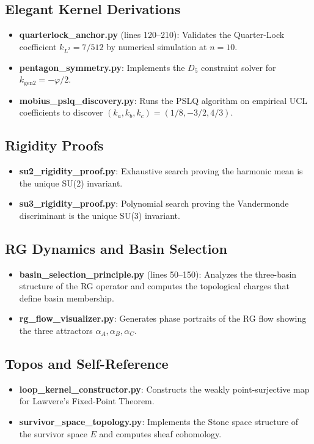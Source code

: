 \documentclass[11pt,twocolumn]{article}
\begin{document}
\subsection{Elegant Kernel Derivations}
\begin{itemize}[leftmargin=1.5em,itemsep=0.2em]
\item \textbf{quarterlock\_anchor.py} (lines 120--210): Validates the Quarter-Lock coefficient $k_{L^2} = 7/512$ by numerical simulation at $n=10$.
\item \textbf{pentagon\_symmetry.py}: Implements the $D_5$ constraint solver for $k_{\text{gen2}} = -\varphi/2$.
\item \textbf{mobius\_pslq\_discovery.py}: Runs the PSLQ algorithm on empirical UCL coefficients to discover $(k_a, k_b, k_c) = (1/8, -3/2, 4/3)$.
\end{itemize}

\subsection{Rigidity Proofs}
\begin{itemize}[leftmargin=1.5em,itemsep=0.2em]
\item \textbf{su2\_rigidity\_proof.py}: Exhaustive search proving the harmonic mean is the unique SU(2) invariant.
\item \textbf{su3\_rigidity\_proof.py}: Polynomial search proving the Vandermonde discriminant is the unique SU(3) invariant.
\end{itemize}

\subsection{RG Dynamics and Basin Selection}
\begin{itemize}[leftmargin=1.5em,itemsep=0.2em]
\item \textbf{basin\_selection\_principle.py} (lines 50--150): Analyzes the three-basin structure of the RG operator and computes the topological charges that define basin membership.
\item \textbf{rg\_flow\_visualizer.py}: Generates phase portraits of the RG flow showing the three attractors $\alpha_A, \alpha_B, \alpha_C$.
\end{itemize}

\subsection{Topos and Self-Reference}
\begin{itemize}[leftmargin=1.5em,itemsep=0.2em]
\item \textbf{loop\_kernel\_constructor.py}: Constructs the weakly point-surjective map for Lawvere's Fixed-Point Theorem.
\item \textbf{survivor\_space\_topology.py}: Implements the Stone space structure of the survivor space $E$ and computes sheaf cohomology.
\end{itemize}
\end{document}
